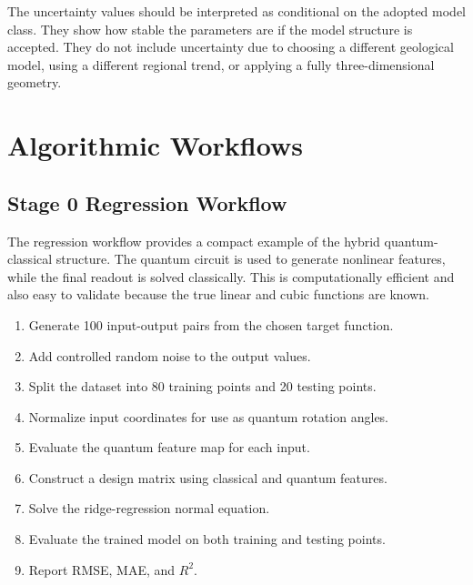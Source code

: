 \documentclass[12pt,a4paper]{article}
\begin{document}
The uncertainty values should be interpreted as conditional on the adopted model class. They show how stable the parameters are if the model structure is accepted. They do not include uncertainty due to choosing a different geological model, using a different regional trend, or applying a fully three-dimensional geometry.

\section{Algorithmic Workflows}
\subsection{Stage 0 Regression Workflow}
The regression workflow provides a compact example of the hybrid quantum-classical structure. The quantum circuit is used to generate nonlinear features, while the final readout is solved classically. This is computationally efficient and also easy to validate because the true linear and cubic functions are known.

\begin{enumerate}
    \item Generate 100 input-output pairs from the chosen target function.
    \item Add controlled random noise to the output values.
    \item Split the dataset into 80 training points and 20 testing points.
    \item Normalize input coordinates for use as quantum rotation angles.
    \item Evaluate the quantum feature map for each input.
    \item Construct a design matrix using classical and quantum features.
    \item Solve the ridge-regression normal equation.
    \item Evaluate the trained model on both training and testing points.
    \item Report RMSE, MAE, and $R^2$.
\end{enumerate}
\end{document}
